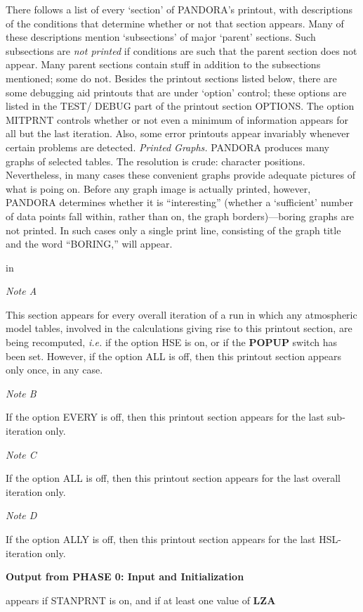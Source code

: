 There follows a list of every `section' of PANDORA's printout, with
descriptions of the conditions that determine whether or not
that section appears.
Many of these descriptions mention `subsections' of major `parent'
sections. Such subsections are {\it not printed}
if conditions are such that the parent section does not appear.
Many parent sections contain stuff in addition to the subsections
mentioned; some do not.
\blankline
Besides the printout sections listed below, there are some debugging
aid \break printouts that are under `option' control; these options are
listed in the TEST/ DEBUG part of the printout section OPTIONS.
The option MITPRNT controls whether or not even a 
minimum of information appears for all but the last iteration. Also,
some error printouts appear invariably whenever certain problems are
detected.
\blankline
{\it Printed Graphs.} PANDORA produces many graphs of selected tables.
The resolution is crude: character positions. Nevertheless, in many cases
these convenient graphs provide adequate pictures of what is poing on.
Before any graph image is actually printed, however, PANDORA determines
whether it is ``interesting'' (\ie whether a `sufficient' number of data
points fall within, rather than on, the graph borders)---boring graphs
are not printed. In such cases only a single print line, consisting of the
graph title and the word ``BORING,'' will appear.   \par
\ej
{} in
\centerline{}
\blankline
\centerline{\it Note A}
\np
This section appears for every overall iteration of a run in which any
atmospheric model tables, involved in the calculations giving rise to this
printout section, are being recomputed, {\it i.e.} if the option HSE
is on, or if the {\bf POPUP} switch has been set. However, if the option
ALL is off, then this printout section appears only once, in any
case.
\blankline
\centerline{\it Note B}
\np
If the option EVERY is off, then this printout section appears for
the last sub-iteration only.
\blankline
\centerline{\it Note C}
\np
If the option ALL is off, then this printout section appears for the
last overall \break iteration only.
\blankline
\centerline{\it Note D}
\np
If the option ALLY is off, then this printout section appears for the
last HSL-iteration only.
\ej
\parindent=0pt
\centerline{\bf Output from {\rm PHASE 0}: Input and Initialization}
\blankline
\blankline
\blankline
{} \par
appears if STANPRNT is on, and if at least one value of {\bf LZA}
